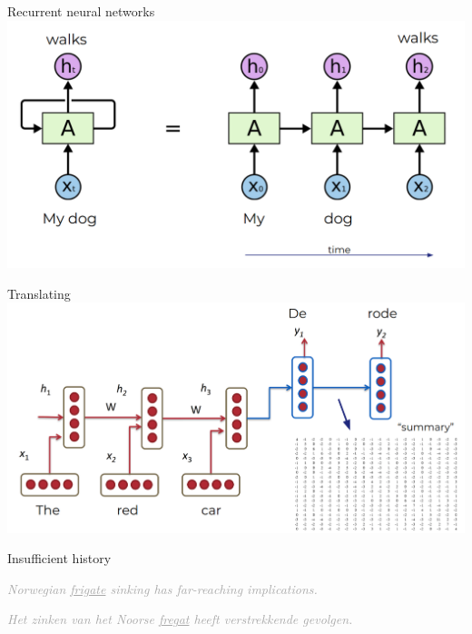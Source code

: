 \documentclass[pdf]{beamer}
\newcommand{\demo}[1]{\textit{\textcolor{darkgray}{#1}}}
\begin{document}
\begin{frame}{Recurrent neural networks}
  \includegraphics[width=\textwidth]{figures/rnn.png}
\end{frame}
  
\begin{frame}{Translating}
  \includegraphics[width=\textwidth]{figures/encoder-decoder.png}
  \end{frame}

  \begin{frame}{Insufficient history}
    \begin{center}
      \demo{Norwegian \underline{frigate} sinking has far-reaching implications.}
      \end{center}
      \begin{center}
        \demo{Het zinken van het Noorse \underline{fregat} heeft verstrekkende gevolgen.}
      \end{center}
    \end{frame}
\end{document}
